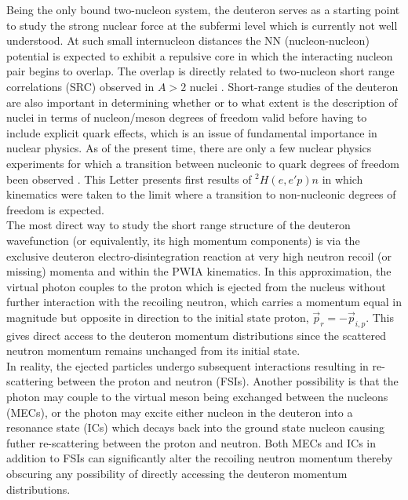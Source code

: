 Being the only bound two-nucleon system, the deuteron serves as a starting point to study the strong nuclear force at the subfermi level which is currently
not well understood. At such small internucleon distances the NN (nucleon-nucleon) potential is expected to exhibit a repulsive core in which the interacting
nucleon pair begins to overlap. The overlap is directly related to two-nucleon short range correlations (SRC) observed in $A>2$ nuclei \cite{PhysRevC.68.014313,PhysRevLett.96.082501,PhysRevLett.99.072501,Fomin_2017}.
Short-range studies of the deuteron are also important in determining whether or to what extent is the description of nuclei in terms of nucleon/meson degrees of freedom valid before
having to include explicit quark effects, which is an issue of fundamental importance in nuclear physics\cite{pr01-020}. As of the present time, there are only a few nuclear physics experiments for
which a transition between nucleonic to quark degrees of freedom been observed \cite{PhysRevLett.81.4576,PhysRevLett.87.102302,PhysRevC.66.042201}.
This Letter presents first results of $^{2}H(e,e'p)n$ in which kinematics were taken to the limit where a transition to non-nucleonic degrees of freedom is expected.\\
\indent The most direct way to study the short range structure of the deuteron wavefunction (or equivalently, its high momentum components) is via the exclusive deuteron
electro-disintegration reaction at very high neutron recoil (or missing) momenta and within the PWIA kinematics. In this approximation, the virtual photon couples to
the proton which is ejected from the nucleus without further interaction with the recoiling neutron, which carries a momentum equal in magnitude but opposite in direction
to the initial state proton, $\vec{p}_{r} = -\vec{p}_{i,p}$. This gives direct access to the deuteron momentum distributions since the scattered neutron momentum remains unchanged from its initial state. \\
\indent In reality, the ejected particles undergo subsequent interactions resulting in re-scattering between the proton and neutron (FSIs). Another possibility is that the
photon may couple to the virtual meson being exchanged between the nucleons (MECs), or the photon may excite either nucleon in the deuteron into a resonance state (ICs) which
decays back into the ground state nucleon causing futher re-scattering between the proton and neutron. Both MECs and ICs in addition to FSIs can significantly alter the recoiling neutron
momentum thereby obscuring any possibility of directly accessing the deuteron momentum distributions. \\
